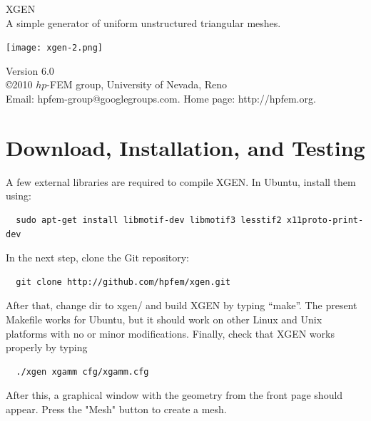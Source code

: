\documentclass[12pt]{article}
\begin{document}
  \begin{titlepage}
  \begin{center}
\vbox{}

    \vspace{30mm}

    {\Huge  XGEN}\\[6mm]

A simple generator of uniform unstructured triangular meshes.

    \vspace{20mm}

\begin{center}
\texttt{[image: xgen-2.png]}
\end{center}
    \vspace{20mm}

    Version 6.0\\
    \copyright 2010 $hp$-FEM group, University of Nevada, Reno\\
    Email: hpfem-group@googlegroups.com. Home page: http://hpfem.org.

  \end{center}
  \end{titlepage}

  \section{Download, Installation, and Testing} \label{getting}
  
  A few external libraries are required to compile XGEN. In Ubuntu, install them using:

{\footnotesize
\begin{verbatim}
  sudo apt-get install libmotif-dev libmotif3 lesstif2 x11proto-print-dev
\end{verbatim}
}
\noindent
  In the next step, clone the Git repository:
{\footnotesize
\begin{verbatim}
  git clone http://github.com/hpfem/xgen.git
\end{verbatim}
}
\noindent
\normalsize
  After that, change dir to xgen/ and build XGEN by typing ``make''. The present 
  Makefile works for Ubuntu, but it should work on other Linux and Unix 
  platforms with no or minor modifications. Finally, check that XGEN works
  properly by typing 
 \noindent
{\footnotesize
\begin{verbatim}
  ./xgen xgamm cfg/xgamm.cfg
\end{verbatim}
} 
\noindent
After this, a graphical window with the geometry from the front page 
should appear. Press the "Mesh" button to create a mesh.
\end{document}
